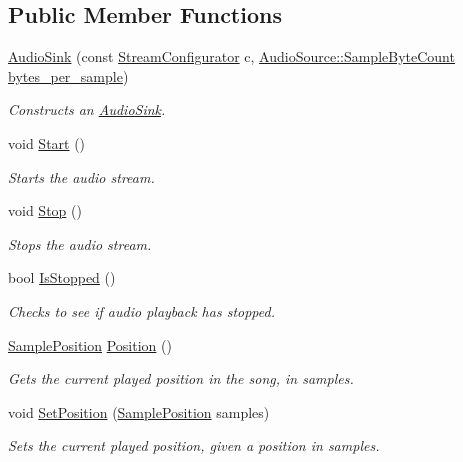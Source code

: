 \subsection*{Public Member Functions}
\begin{DoxyCompactItemize}
\item 
\hyperlink{classAudioSink_ab4adf46e3e93d35e2b5fb1ab0e75793b}{Audio\+Sink} (const \hyperlink{classAudioSink_ae5b8370aa17c24c6fc8f8e0c5778168c}{Stream\+Configurator} c, \hyperlink{classAudioSource_a1c8138ec9ffb9fd1394d0ad0782d60fa}{Audio\+Source\+::\+Sample\+Byte\+Count} \hyperlink{classAudioSink_a5eab0f7111187c0416feb542010e4a2e}{bytes\+\_\+per\+\_\+sample})
\begin{DoxyCompactList}\small\item\em Constructs an \hyperlink{classAudioSink}{Audio\+Sink}. \end{DoxyCompactList}\item 
void \hyperlink{classAudioSink_a18196e0dec3b4d58e17c454379ed0728}{Start} ()
\begin{DoxyCompactList}\small\item\em Starts the audio stream. \end{DoxyCompactList}\item 
void \hyperlink{classAudioSink_af1937ad09b555f0b88d285e8fd7cf433}{Stop} ()
\begin{DoxyCompactList}\small\item\em Stops the audio stream. \end{DoxyCompactList}\item 
bool \hyperlink{classAudioSink_adfa8006db0d1cbe161f15232cb32a324}{Is\+Stopped} ()
\begin{DoxyCompactList}\small\item\em Checks to see if audio playback has stopped. \end{DoxyCompactList}\item 
\hyperlink{classAudioSink_ad2d7d33b3e937d057a4d72afad812737}{Sample\+Position} \hyperlink{classAudioSink_aed168a8ce8ba39105431ab54ab08a007}{Position} ()
\begin{DoxyCompactList}\small\item\em Gets the current played position in the song, in samples. \end{DoxyCompactList}\item 
void \hyperlink{classAudioSink_a5ca539e3440d168eec0892114a947529}{Set\+Position} (\hyperlink{classAudioSink_ad2d7d33b3e937d057a4d72afad812737}{Sample\+Position} samples)
\begin{DoxyCompactList}\small\item\em Sets the current played position, given a position in samples. \end{DoxyCompactList}\item 

\end{DoxyCompactItemize}
